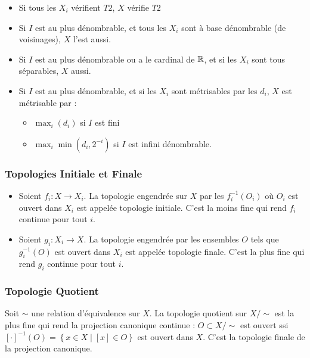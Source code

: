 \documentclass{cours}
\begin{document}
\begin{proposition}
    \begin{itemize}
        \item Si tous les $X_{i}$ vérifient $T2$, $X$ vérifie $T2$
        \item Si $I$ est au plus dénombrable, et tous les $X_{i}$ sont à base dénombrable (de voisinages), $X$ l'est aussi.
        \item Si $I$ est au plus dénombrable ou a le cardinal de $\mathbb{R}$, et si les $X_{i}$ sont tous séparables, $X$ aussi.
        \item Si $I$ est au plus dénombrable, et si les $X_{i}$ sont métrisables par les $d_{i}$, $X$ est métrisable par :
        \begin{itemize}
            \item $\max_{i}(d_{i})$ si $I$ est fini
            \item $\max_{i}\min(d_{i}, 2^{-i})$ si $I$ est infini dénombrable.
        \end{itemize}
    \end{itemize}

\end{proposition}

\subsubsection{Topologies Initiale et Finale}
\begin{definition}
    \begin{itemize}
        \item Soient $f_{i} : X \rightarrow X_{i}$. La topologie engendrée sur $X$ par les $f_{i}^{-1}(O_{i})$ où $O_{i}$ est ouvert dans $X_{i}$ est appelée topologie initiale. C'est la moins fine qui rend $f_{i}$ continue pour tout $i$.
        \item Soient $g_{i} : X_{i} \rightarrow X$. La topologie engendrée par les ensembles $O$ tels que $g_{i}^{-1}(O)$ est ouvert dans $X_{i}$ est appelée topologie finale. C'est la plus fine qui rend $g_{i}$ continue pour tout $i$. 
    \end{itemize}
\end{definition}

\subsubsection{Topologie Quotient}
\begin{definition}
    Soit $\sim$ une relation d'équivalence sur $X$. La topologie quotient sur $X/\sim$ est la plus fine qui rend la projection canonique continue : $O \subset X/\sim$ est ouvert ssi $\left[\cdot\right]^{-1}(O) = \left\{x \in X \mid \left[x\right] \in O\right\}$ est ouvert dans $X$. C'est la topologie finale de la projection canonique.
\end{definition}
\end{document}
